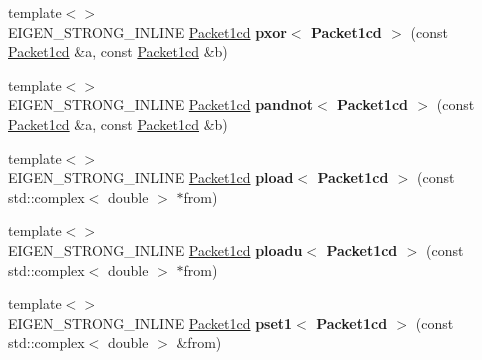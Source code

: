 \begin{DoxyCompactItemize}
\item 
\mbox{\label{namespace_eigen_1_1internal_a880a3edd216d4a56537158ad0098d4c9}} 
{\footnotesize template$<$$>$ }\\E\+I\+G\+E\+N\+\_\+\+S\+T\+R\+O\+N\+G\+\_\+\+I\+N\+L\+I\+NE \hyperlink{struct_eigen_1_1internal_1_1_packet1cd}{Packet1cd} {\bfseries pxor$<$ Packet1cd $>$} (const \hyperlink{struct_eigen_1_1internal_1_1_packet1cd}{Packet1cd} \&a, const \hyperlink{struct_eigen_1_1internal_1_1_packet1cd}{Packet1cd} \&b)
\item 
\mbox{\label{namespace_eigen_1_1internal_abca07ffc8f477060d1d23f9c1774d47a}} 
{\footnotesize template$<$$>$ }\\E\+I\+G\+E\+N\+\_\+\+S\+T\+R\+O\+N\+G\+\_\+\+I\+N\+L\+I\+NE \hyperlink{struct_eigen_1_1internal_1_1_packet1cd}{Packet1cd} {\bfseries pandnot$<$ Packet1cd $>$} (const \hyperlink{struct_eigen_1_1internal_1_1_packet1cd}{Packet1cd} \&a, const \hyperlink{struct_eigen_1_1internal_1_1_packet1cd}{Packet1cd} \&b)
\item 
\mbox{\label{namespace_eigen_1_1internal_ab29b09cdaffff04900c437c6c0953aa0}} 
{\footnotesize template$<$$>$ }\\E\+I\+G\+E\+N\+\_\+\+S\+T\+R\+O\+N\+G\+\_\+\+I\+N\+L\+I\+NE \hyperlink{struct_eigen_1_1internal_1_1_packet1cd}{Packet1cd} {\bfseries pload$<$ Packet1cd $>$} (const std\+::complex$<$ double $>$ $\ast$from)
\item 
\mbox{\label{namespace_eigen_1_1internal_a64d8915097b2e3aca83d8ef2d6ec1c70}} 
{\footnotesize template$<$$>$ }\\E\+I\+G\+E\+N\+\_\+\+S\+T\+R\+O\+N\+G\+\_\+\+I\+N\+L\+I\+NE \hyperlink{struct_eigen_1_1internal_1_1_packet1cd}{Packet1cd} {\bfseries ploadu$<$ Packet1cd $>$} (const std\+::complex$<$ double $>$ $\ast$from)
\item 
\mbox{\label{namespace_eigen_1_1internal_ae465ba2b58c9d3b3e9b48f3fd272aab1}} 
{\footnotesize template$<$$>$ }\\E\+I\+G\+E\+N\+\_\+\+S\+T\+R\+O\+N\+G\+\_\+\+I\+N\+L\+I\+NE \hyperlink{struct_eigen_1_1internal_1_1_packet1cd}{Packet1cd} {\bfseries pset1$<$ Packet1cd $>$} (const std\+::complex$<$ double $>$ \&from)
\item 

\end{DoxyCompactItemize}
